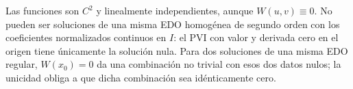 Las funciones son \(C^2\) y linealmente independientes, aunque \(W(u,v)\equiv0\). No pueden ser soluciones de una misma EDO homogénea de segundo orden con los coeficientes normalizados continuos en \(I\): el PVI con valor y derivada cero en el origen tiene únicamente la solución nula. Para dos soluciones de una misma EDO regular, \(W(x_0)=0\) da una combinación no trivial con esos dos datos nulos; la unicidad obliga a que dicha combinación sea idénticamente cero.
